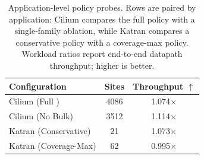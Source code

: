 \begin{table}[t]
\centering
\caption{Application-level \lang{} policy probes. Rows are paired by
application: Cilium compares the full policy with a single-family ablation,
while Katran compares a conservative policy with a coverage-max policy.
Workload ratios report end-to-end datapath throughput; higher is better.}
\label{tab:app_case_studies}
\small
\begin{tabular}{lcc}
\toprule
Configuration & Sites & Throughput $\uparrow$ \\
\midrule
Cilium (Full \lang{}) &
4086 &
1.074$\times$ \\

Cilium (No Bulk) &
3512 &
1.114$\times$ \\

Katran (Conservative) &
21 &
1.073$\times$ \\

Katran (Coverage-Max) &
62 &
0.995$\times$ \\
\bottomrule
\end{tabular}
\end{table}